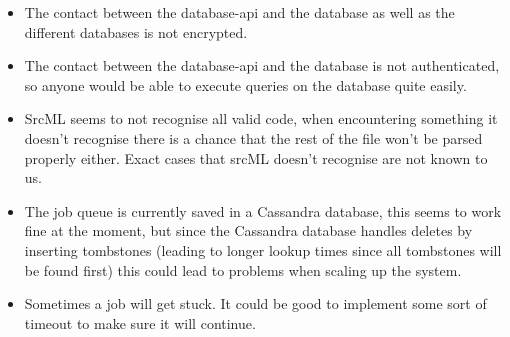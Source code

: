 \documentclass[./Main.tex]{subfiles}
\begin{document}
\begin{itemize}
    \item The contact between the database-api and the database as well as the different databases is not encrypted.
    \item The contact between the database-api and the database is not authenticated, so anyone would be able to execute queries on the database quite easily.
    \item SrcML seems to not recognise all valid code, when encountering something it doesn't recognise there is a chance that the rest of the file won't be parsed properly either. Exact cases that srcML doesn't recognise are not known to us.
    \item The job queue is currently saved in a Cassandra database, this seems to work fine at the moment, but since the Cassandra database handles deletes by inserting tombstones (leading to longer lookup times since all tombstones will be found first) this could lead to problems when scaling up the system.
    \item Sometimes a job will get stuck. It could be good to implement some sort of timeout to make sure it will continue.
\end{itemize}
\end{document}

